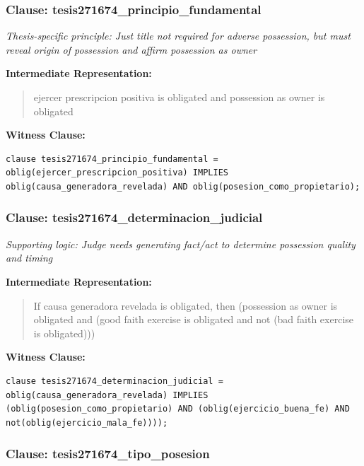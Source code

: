 \documentclass[11pt,a4paper]{article}
\begin{document}
\subsubsection{Clause: tesis271674\_principio\_fundamental}

\textit{Thesis-specific principle: Just title not required for adverse possession, but must reveal origin of possession and affirm possession as owner}

\textbf{Intermediate Representation:}

\begin{quote}
ejercer prescripcion positiva is obligated and possession as owner is obligated
\end{quote}

\textbf{Witness Clause:}

\begin{lstlisting}[style=witnessstyle, language=Witness]
clause tesis271674_principio_fundamental = oblig(ejercer_prescripcion_positiva) IMPLIES oblig(causa_generadora_revelada) AND oblig(posesion_como_propietario);
\end{lstlisting}

\subsubsection{Clause: tesis271674\_determinacion\_judicial}

\textit{Supporting logic: Judge needs generating fact/act to determine possession quality and timing}

\textbf{Intermediate Representation:}

\begin{quote}
If causa generadora revelada is obligated, then (possession as owner is obligated and (good faith exercise is obligated and not (bad faith exercise is obligated)))
\end{quote}

\textbf{Witness Clause:}

\begin{lstlisting}[style=witnessstyle, language=Witness]
clause tesis271674_determinacion_judicial = oblig(causa_generadora_revelada) IMPLIES (oblig(posesion_como_propietario) AND (oblig(ejercicio_buena_fe) AND not(oblig(ejercicio_mala_fe))));
\end{lstlisting}

\subsubsection{Clause: tesis271674\_tipo\_posesion}
\end{document}
